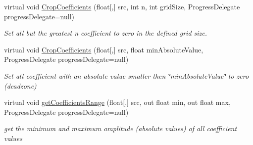 \begin{DoxyCompactItemize}
virtual void \hyperlink{class_turbo_wavelets_1_1_wavelet2_d_aa1e399d2ab5f85843185a2895bf7f7ad}{\-Crop\-Coefficients} (float\mbox{[},\mbox{]} src, int n, int grid\-Size, \-Progress\-Delegate progress\-Delegate=null)
\begin{DoxyCompactList}\small\item\em \-Set all but the greatest n coefficient to zero in the defined grid size. \end{DoxyCompactList}\item 
virtual void \hyperlink{class_turbo_wavelets_1_1_wavelet2_d_a9abbbf0cffd0d8dca5d78d6ad4dad399}{\-Crop\-Coefficients} (float\mbox{[},\mbox{]} src, float min\-Absolute\-Value, \-Progress\-Delegate progress\-Delegate=null)
\begin{DoxyCompactList}\small\item\em \-Set all coefficient with an absolute value smaller then \char`\"{}min\-Absolute\-Value\char`\"{} to zero (deadzone) \end{DoxyCompactList}\item 
virtual void \hyperlink{class_turbo_wavelets_1_1_wavelet2_d_ad25227565f3b5e5953e951ad5b375654}{get\-Coefficients\-Range} (float\mbox{[},\mbox{]} src, out float min, out float max, \-Progress\-Delegate progress\-Delegate=null)
\begin{DoxyCompactList}\small\item\em get the minimum and maximum amplitude (absolute values) of all coefficient values \end{DoxyCompactList}\end{DoxyCompactItemize}
